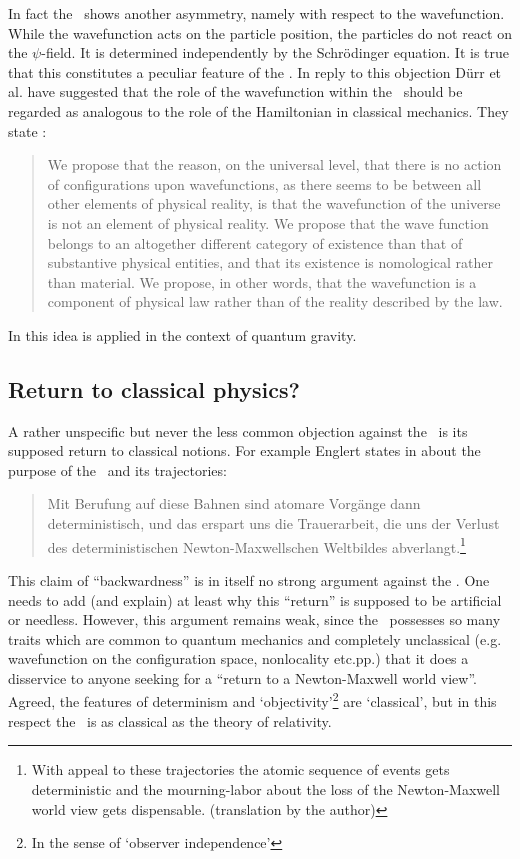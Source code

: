 In fact the \dbb\ shows another asymmetry, namely with respect to the wavefunction. 
While the wavefunction acts on the particle position, the particles do not react on 
the $\psi$-field. It is determined independently by the Schr\"odinger equation.
It is true that this constitutes a peculiar feature of the \dbb. 
In reply to this objection D\"urr et al. \cite{duerr97} have suggested that the role of the wavefunction within the \dbb\ 
should be regarded  as analogous to the role of the Hamiltonian in classical mechanics. They state \cite{duerr97}:
\begin{quote}
We propose that the reason, on the universal level, that there is no action
of configurations upon wavefunctions, as there seems to be between all
other elements of physical reality, is that the wavefunction of the
universe is not an element of physical reality. We propose that the wave
function belongs to an altogether different category of existence than that
of substantive physical entities, and that its existence is nomological rather
than material. We propose, in other words, that the wavefunction is a
component of physical law rather than of the reality described by the law.
\end{quote}
In \cite{gold2002} this idea is applied in the context of quantum gravity. 

\subsection{Return to classical physics? \label{return}}
A rather unspecific but never the less common objection against the \dbb\ is its supposed return to classical notions. For example 
Englert states in \cite{rezension} about the purpose of the \dbb\ and its trajectories: 
\begin{quote}
Mit Berufung auf diese Bahnen sind atomare Vorg\"ange dann deterministisch, und das erspart uns die Trauerarbeit, die uns der 
Verlust des deterministischen Newton-Maxwellschen Weltbildes abverlangt.\footnote{With appeal to these trajectories the atomic 
sequence of events gets deterministic and the  mourning-labor about the loss of the Newton-Maxwell world view gets dispensable. 
(translation by 
the author)}
\end{quote}
This claim of  ``backwardness'' is in itself no strong argument against the \dbb. One needs to add (and explain) at least why this 
``return'' is supposed to be  artificial or needless. However, this argument remains weak, since the \dbb\ possesses so many traits 
which are common to quantum mechanics and completely unclassical (e.g. wavefunction on the configuration space, nonlocality etc.pp.) 
that it does a 
disservice to anyone seeking for a ``return to a Newton-Maxwell 
world view''. Agreed, the features of determinism and `objectivity'\footnote{In the sense of `observer independence'} are `classical', 
but in this respect the \dbb\ is as classical as the theory of relativity. 

